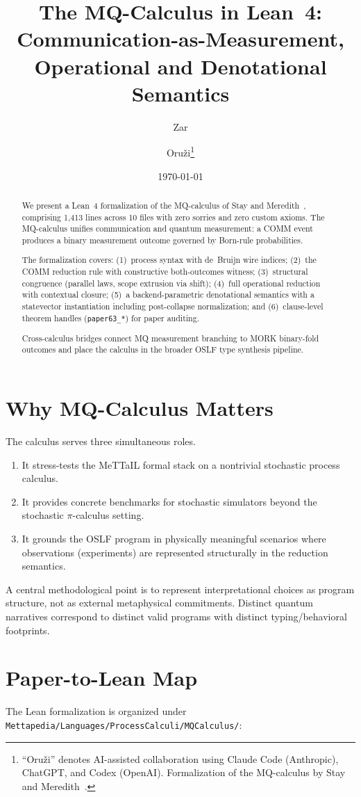 \documentclass[11pt]{article}
\title{The MQ-Calculus in Lean~4:\\
Communication-as-Measurement, Operational and Denotational Semantics}
\author{Zar \and Oru\v{z}i\footnote{``Oru\v{z}i'' denotes AI-assisted collaboration
using Claude Code (Anthropic), ChatGPT, and Codex (OpenAI).
Formalization of the MQ-calculus by Stay and Meredith~\cite{stay-meredith-mq}.}}
\date{\today}
\begin{document}
\maketitle

\begin{abstract}
We present a Lean~4 formalization of the MQ-calculus of Stay and
Meredith~\cite{stay-meredith-mq}, comprising 1{,}413 lines across 10 files
with zero sorries and zero custom axioms.  The MQ-calculus unifies
communication and quantum measurement: a COMM event produces a binary
measurement outcome governed by Born-rule probabilities.

The formalization covers: (1)~process syntax with de~Bruijn wire indices;
(2)~the COMM reduction rule with constructive both-outcomes witness;
(3)~structural congruence (parallel laws, scope extrusion via shift);
(4)~full operational reduction with contextual closure;
(5)~a backend-parametric denotational semantics with a statevector
instantiation including post-collapse normalization; and
(6)~clause-level theorem handles (\texttt{paper63\_*}) for paper auditing.

Cross-calculus bridges connect MQ measurement branching to MORK binary-fold
outcomes and place the calculus in the broader OSLF type synthesis pipeline.
\end{abstract}

\section{Why MQ-Calculus Matters}
The calculus serves three simultaneous roles.
\begin{enumerate}[leftmargin=1.5em]
  \item It stress-tests the MeTTaIL formal stack on a nontrivial stochastic process calculus.
  \item It provides concrete benchmarks for stochastic simulators beyond the stochastic $\pi$-calculus setting.
  \item It grounds the OSLF program in physically meaningful scenarios where observations (experiments) are represented structurally in the reduction semantics.
\end{enumerate}

A central methodological point is to represent interpretational choices as program structure, not as external metaphysical commitments. Distinct quantum narratives correspond to distinct valid programs with distinct typing/behavioral footprints.

\section{Paper-to-Lean Map}
The Lean formalization is organized under
\texttt{Mettapedia/Languages/ProcessCalculi/MQCalculus/}:
\end{document}

